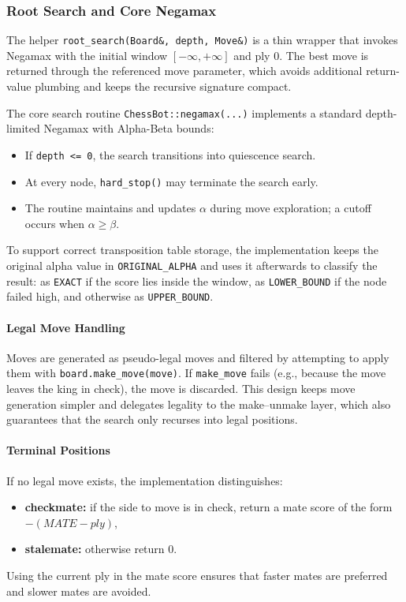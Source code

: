 \subsubsection{Root Search and Core Negamax}

The helper \texttt{root\_search(Board\&, depth, Move\&)} is a thin wrapper that
invokes Negamax with the initial window $[-\infty, +\infty]$ and ply $0$.
The best move is returned through the referenced move parameter, which avoids
additional return-value plumbing and keeps the recursive signature compact.

The core search routine \texttt{ChessBot::negamax(...)} implements a standard
depth-limited Negamax with Alpha-Beta bounds:
\begin{itemize}
    \item If \texttt{depth <= 0}, the search transitions into quiescence search.
    \item At every node, \texttt{hard\_stop()} may terminate the search early.
    \item The routine maintains and updates $\alpha$ during move exploration; a
    cutoff occurs when $\alpha \ge \beta$.
\end{itemize}

To support correct transposition table storage, the implementation keeps the
original alpha value in \texttt{ORIGINAL\_ALPHA} and uses it afterwards to
classify the result: as \texttt{EXACT} if the score lies inside the window, as
\texttt{LOWER\_BOUND} if the node failed high, and otherwise as
\texttt{UPPER\_BOUND}.

\paragraph{Legal Move Handling}
Moves are generated as pseudo-legal moves and filtered by attempting to apply
them with \texttt{board.make\_move(move)}. If \texttt{make\_move} fails (e.g.,
because the move leaves the king in check), the move is discarded. This design
keeps move generation simpler and delegates legality to the make--unmake layer,
which also guarantees that the search only recurses into legal positions.

\paragraph{Terminal Positions}
If no legal move exists, the implementation distinguishes:
\begin{itemize}
    \item \textbf{checkmate:} if the side to move is in check, return a mate score
    of the form $-(MATE - ply)$,
    \item \textbf{stalemate:} otherwise return $0$.
\end{itemize}
Using the current ply in the mate score ensures that faster mates are preferred
and slower mates are avoided.

